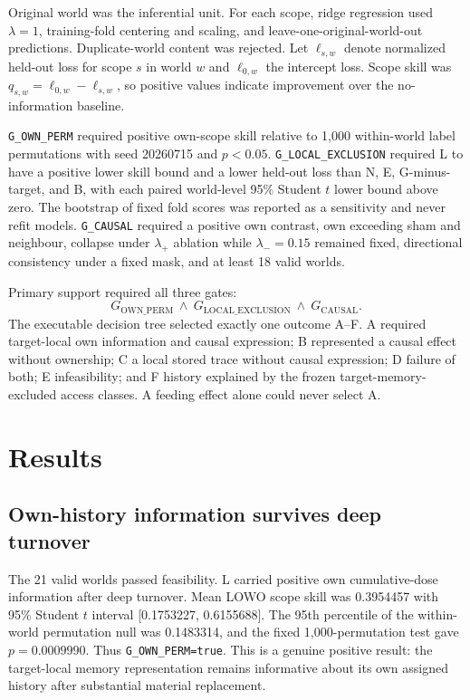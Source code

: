 \documentclass[11pt]{article}
\newcommand{\code}[1]{\texttt{#1}}
\begin{document}
Original world was the inferential unit. For each scope, ridge regression used $\lambda=1$, training-fold centering and scaling, and leave-one-original-world-out predictions. Duplicate-world content was rejected. Let $\ell_{s,w}$ denote normalized held-out loss for scope $s$ in world $w$ and $\ell_{0,w}$ the intercept loss. Scope skill was $q_{s,w}=\ell_{0,w}-\ell_{s,w}$, so positive values indicate improvement over the no-information baseline.

\code{G\_OWN\_PERM} required positive own-scope skill relative to 1,000 within-world label permutations with seed 20260715 and $p<0.05$. \code{G\_LOCAL\_EXCLUSION} required L to have a positive lower skill bound and a lower held-out loss than N, E, G-minus-target, and B, with each paired world-level 95\% Student $t$ lower bound above zero. The bootstrap of fixed fold scores was reported as a sensitivity and never refit models. \code{G\_CAUSAL} required a positive own contrast, own exceeding sham and neighbour, collapse under $\lambda_+$ ablation while $\lambda_-=0.15$ remained fixed, directional consistency under a fixed mask, and at least 18 valid worlds.

Primary support required all three gates:
\begin{equation}
G_{\mathrm{OWN\_PERM}}\ \land\ G_{\mathrm{LOCAL\_EXCLUSION}}\ \land\ G_{\mathrm{CAUSAL}}.
\end{equation}
The executable decision tree selected exactly one outcome A--F. A required target-local own information and causal expression; B represented a causal effect without ownership; C a local stored trace without causal expression; D failure of both; E infeasibility; and F history explained by the frozen target-memory-excluded access classes. A feeding effect alone could never select A.

\section{Results}

\subsection{Own-history information survives deep turnover}

The 21 valid worlds passed feasibility. L carried positive own cumulative-dose information after deep turnover. Mean LOWO scope skill was 0.3954457 with 95\% Student $t$ interval [0.1753227, 0.6155688]. The 95th percentile of the within-world permutation null was 0.1483314, and the fixed 1,000-permutation test gave $p=0.0009990$. Thus \code{G\_OWN\_PERM=true}. This is a genuine positive result: the target-local memory representation remains informative about its own assigned history after substantial material replacement.
\end{document}
